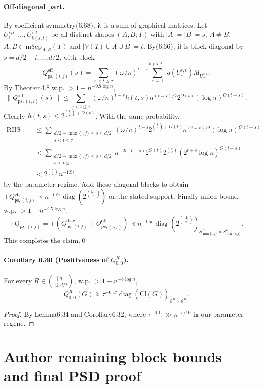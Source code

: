 \documentclass[10pt,a4paper]{article}
\begin{document}
\paragraph{Off-diagonal part.} By coefficient symmetry(6.68), it is a sum of graphical matrices. Let $U_1^{s,t},\ldots,U_{h(s,t)}^{s,t}$ be all distinct shapes $(A,B;T)$ with $|A|=|B|=s$, $A\ne B$, $A,B\in\mathrm{mSep}_{A,B}(T)$ and $|V(T)\cup A\cup B|=t$. By(6.66), it is block-diagonal by $s=d/2-i,\ldots,d/2$, with block
\[Q_{\mathrm{ps},(i,j)}^{\mathrm{off}}(s)=\sum_{s<t\le\tau}(\omega/n)^{t-s}\sum_{x=1}^{h(s,t)}q(U_x^{s,t})M_{U_x^{s,t}}.\]
By Theorem4.8 w.p. $>1-n^{-9.8\log n}$,
\[\|Q_{\mathrm{ps},(i,j)}^{\mathrm{off}}(s)\|\le\sum_{s<t\le\tau}(\omega/n)^{t-s}h(t,s)n^{(t-s)/2}2^{O(t)}(\log n)^{O(t-s)}.\tag{6.73}\]
Clearly $h(t,s)\le2^{\binom t2+O(t)}$. With the same probability,
\begin{align*}\text{RHS of(6.73)}&\le\sum_{\substack{d/2-\max\{i,j\}\le s\le d/2\\s<t\le\tau}}(\omega/n)^{t-s}2^{\binom t2+O(t)}n^{(t-s)/2}(\log n)^{O(t-s)}\\&<\sum_{\substack{d/2-\max\{i,j\}\le s\le d/2\\s<t\le\tau}}n^{-2\epsilon(t-s)}2^{O(t)}2^{\binom s2}(2^{t+s}\log n)^{O(t-s)}\\&<2^{\binom s2}n^{-1.9\epsilon},\end{align*}
by the parameter regime. Add these diagonal blocks to obtain $\pm Q_{\mathrm{ps},(i,j)}^{\mathrm{off}}\prec n^{-1.9\epsilon}\operatorname{diag}(2^{\binom{|A|}2})$ on the stated support. Finally union-bound: w.p. $>1-n^{-9.5\log n}$,
\[\pm Q_{\mathrm{ps},(i,j)}=\pm(Q_{\mathrm{ps},(i,j)}^{\mathrm{diag}}+Q_{\mathrm{ps},(i,j)}^{\mathrm{off}})\prec n^{-1.5\epsilon}\operatorname{diag}(2^{\binom{|A|}2})_{S^R_{\min\{i,j\}}\times S^R_{\min\{i,j\}}}.\]
This completes the claim.\qed
\paragraph{Corollary 6.36 (Positiveness of $Q_{0,0}^R$).} For every $R\in\binom{[n]}{\le d/2}$, w.p. $>1-n^{-8\log n}$,
\[Q_{0,0}^R(G)\succeq\tau^{-6.1\tau}\operatorname{diag}(\widetilde{\mathrm{Cl}}(G))_{\mathcal S^R\times\mathcal S^R}.\]
\begin{proof}By Lemma6.34 and Corollary6.32, where $\tau^{-6.1\tau}\gg n^{-\epsilon/10}$ in our parameter regime.\end{proof}

\section*{Author remaining block bounds and final PSD proof}
\end{document}
